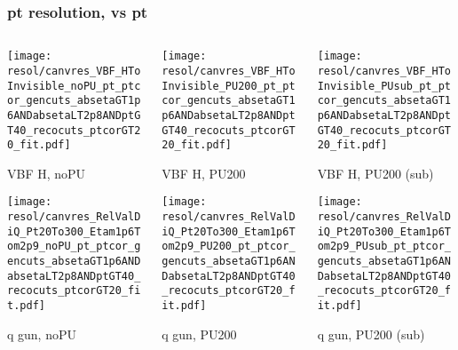 \documentclass[8pt]{beamer}
\begin{document}
  \begin{frame}
  \frametitle{pt resolution, vs pt}
  
  \begin{columns}
   \begin{column}{0.35\textwidth}
     \texttt{[image: resol/canvres\_VBF\_HToInvisible\_noPU\_pt\_ptcor\_gencuts\_absetaGT1p6ANDabsetaLT2p8ANDptGT40\_recocuts\_ptcorGT20\_fit.pdf]}
     
     VBF H, noPU
    
     \texttt{[image: resol/canvres\_RelValDiQ\_Pt20To300\_Etam1p6Tom2p9\_noPU\_pt\_ptcor\_gencuts\_absetaGT1p6ANDabsetaLT2p8ANDptGT40\_recocuts\_ptcorGT20\_fit.pdf]}
     
     q gun, noPU
   \end{column}
   \begin{column}{0.35\textwidth}
     \texttt{[image: resol/canvres\_VBF\_HToInvisible\_PU200\_pt\_ptcor\_gencuts\_absetaGT1p6ANDabsetaLT2p8ANDptGT40\_recocuts\_ptcorGT20\_fit.pdf]}
     
     VBF H, PU200
    
     \texttt{[image: resol/canvres\_RelValDiQ\_Pt20To300\_Etam1p6Tom2p9\_PU200\_pt\_ptcor\_gencuts\_absetaGT1p6ANDabsetaLT2p8ANDptGT40\_recocuts\_ptcorGT20\_fit.pdf]}
     
     q gun, PU200
   \end{column}
   \begin{column}{0.35\textwidth}
     \texttt{[image: resol/canvres\_VBF\_HToInvisible\_PUsub\_pt\_ptcor\_gencuts\_absetaGT1p6ANDabsetaLT2p8ANDptGT40\_recocuts\_ptcorGT20\_fit.pdf]}
     
     VBF H, PU200 (sub)
    
     \texttt{[image: resol/canvres\_RelValDiQ\_Pt20To300\_Etam1p6Tom2p9\_PUsub\_pt\_ptcor\_gencuts\_absetaGT1p6ANDabsetaLT2p8ANDptGT40\_recocuts\_ptcorGT20\_fit.pdf]}
     
     q gun, PU200 (sub)
   \end{column}
  \end{columns}
 \end{frame}
 
\end{document}
